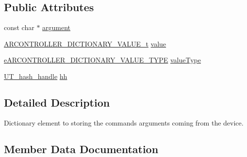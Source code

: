 \subsection*{Public Attributes}
\begin{DoxyCompactItemize}
\item 
const char $\ast$ \hyperlink{struct_a_r_c_o_n_t_r_o_l_l_e_r___d_i_c_t_i_o_n_a_r_y___a_r_g__t_a046cc28400f99a8104c7afc3f9155dfe}{argument}
\item 
\hyperlink{union_a_r_c_o_n_t_r_o_l_l_e_r___d_i_c_t_i_o_n_a_r_y___v_a_l_u_e__t}{A\+R\+C\+O\+N\+T\+R\+O\+L\+L\+E\+R\+\_\+\+D\+I\+C\+T\+I\+O\+N\+A\+R\+Y\+\_\+\+V\+A\+L\+U\+E\+\_\+t} \hyperlink{struct_a_r_c_o_n_t_r_o_l_l_e_r___d_i_c_t_i_o_n_a_r_y___a_r_g__t_a8c22bce57237ef0e171be25346a8d8f3}{value}
\item 
\hyperlink{_a_r_c_o_n_t_r_o_l_l_e_r___dictionary_8h_acf0a626e2d460d1b21698f5ebdd35fc6}{e\+A\+R\+C\+O\+N\+T\+R\+O\+L\+L\+E\+R\+\_\+\+D\+I\+C\+T\+I\+O\+N\+A\+R\+Y\+\_\+\+V\+A\+L\+U\+E\+\_\+\+T\+Y\+PE} \hyperlink{struct_a_r_c_o_n_t_r_o_l_l_e_r___d_i_c_t_i_o_n_a_r_y___a_r_g__t_a4f739d755b914a9f7b36d8140bc4470d}{value\+Type}
\item 
\hyperlink{struct_u_t__hash__handle}{U\+T\+\_\+hash\+\_\+handle} \hyperlink{struct_a_r_c_o_n_t_r_o_l_l_e_r___d_i_c_t_i_o_n_a_r_y___a_r_g__t_aa14d0005e84413223140801eebb8a6ee}{hh}
\end{DoxyCompactItemize}


\subsection{Detailed Description}
Dictionary element to storing the commands arguments coming from the device. 

\subsection{Member Data Documentation}
